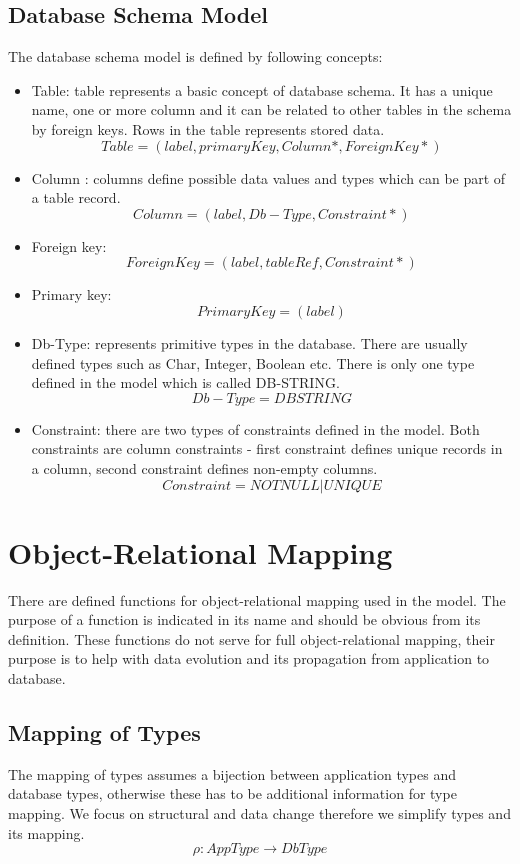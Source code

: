 \documentclass[11pt]{article}
\begin{document}
\subsection{Database Schema Model}
The database schema model is defined by following concepts:
\begin{itemize}
	\item Table: table represents a basic concept of database schema. It has a unique name, one or more column and it can be related to other tables in the schema by foreign keys. Rows in the table represents stored data.
$$
Table = (label, primaryKey, Column*, ForeignKey*)
$$
	\item Column : columns define possible data values and types which can be part of a table record.
$$
Column = (label, Db-Type, Constraint*)
$$

	\item Foreign key:
$$
ForeignKey = (label, tableRef, Constraint*)
$$

	\item Primary key:
$$
PrimaryKey =  (label) 	
$$

	\item Db-Type: represents primitive types in the database. There are usually defined types such as Char, Integer, Boolean etc. There is only one type defined in the model which is called DB-STRING.
$$
Db-Type = DBSTRING
$$

	\item Constraint: there are two types of constraints defined in the model. Both constraints are column constraints - first constraint defines unique records in a column, second constraint defines non-empty columns.
$$
Constraint = NOTNULL | UNIQUE 
$$
\end{itemize}

\section{Object-Relational Mapping}
There are defined functions for object-relational mapping used in the model. The purpose of a function is indicated in its name and should be obvious from its definition. These functions do not serve for full object-relational mapping, their purpose is to help with data evolution and its propagation from application to database.


\subsection{Mapping of Types}
The mapping of types assumes a bijection between application types and database types, otherwise these has to be additional information for type mapping. We focus on structural and data change therefore we simplify types and its mapping.
$$
\rho : AppType \rightarrow DbType
$$
\end{document}
